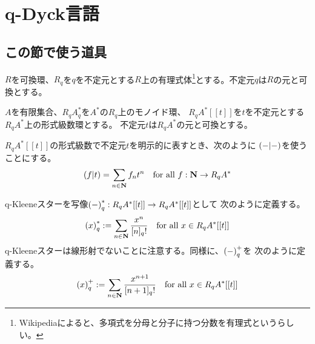 \newcommand{\Brz}{\mycal{B}}
\newcommand{\cat}[1]{\mybf{{#1}}}
\newcommand{\onto}{\myop{onto}}
\newcommand{\Maybe}{\myop{Maybe}}
\newcommand{\dabs}[1]{\left\lVert{#1}\right\rVert}
%
\newcommand{\smallxy}[1]{\vcenter{\xymatrix@R=4pt@C=4pt{#1}}}
\newcommand{\hen}{\ar@{-}}
\newcommand{\er}{\ar@{-}}
%
\newcommand{\wordu}{1_\W}
\newcommand{\treeu}{1_\T}
\newcommand{\Path}{\mycal{P}}
\newcommand{\brz}{Brzozowski}
\newcommand{\diff}{\partial}
\newcommand{\qstar}{q_*}
%
{\setlength\arraycolsep{2pt}
%
\section{q-Dyck言語}\label{s1:q-Dyck言語} %
\subsection{この節で使う道具}\label{s2:この節で使う道具} %
	$R$を可換環、$R_q$を$q$を不定元とする$R$上の有理式体\footnote{
		Wikipediaによると、多項式を分母と分子に持つ分数を有理式というらしい。
	}とする。不定元$q$は$R$の元と可換とする。

	$A$を有限集合、$R_qA_q^*$を$A^*$の$R_q$上のモノイド環、
	$R_qA^*[[t]]$を$t$を不定元とする$R_qA^*$上の形式級数環とする。
	不定元$t$は$R_qA^*$の元と可換とする。
	
	$R_qA^*[[t]]$の形式級数で不定元$t$を明示的に表すとき、次のように
	$\left({-|-}\right)$を使うことにする。
	\begin{equation*}\begin{split}
		\left({f|t}\right) = \sum_{n\in\mathbf{N}} f_nt^n
		\quad\text{for all } f:\mathbf{N}\to R_qA^*
	\end{split}\end{equation*}

	q-Kleeneスターを写像$\left({-}\right)_q^*:R_qA^*[[t]]\to R_qA^*[[t]]$として
	次のように定義する。
	\begin{equation*}\begin{split}
		\left({x}\right)_q^* := \sum_{n\in\mathbf{N}}\frac{x^n}{[n]_q!}
		\quad\text{for all } x\in R_qA^*[[t]]
	\end{split}\end{equation*}
	q-Kleeneスターは線形射でないことに注意する。同様に、$\left({-}\right)_q^+$を
	次のように定義する。
	\begin{equation*}\begin{split}
		\left({x}\right)_q^+ := \sum_{n\in\mathbf{N}}\frac{x^{n+1}}{[n+1]_q!}
		\quad\text{for all } x\in R_qA^*[[t]]
	\end{split}\end{equation*}

}
